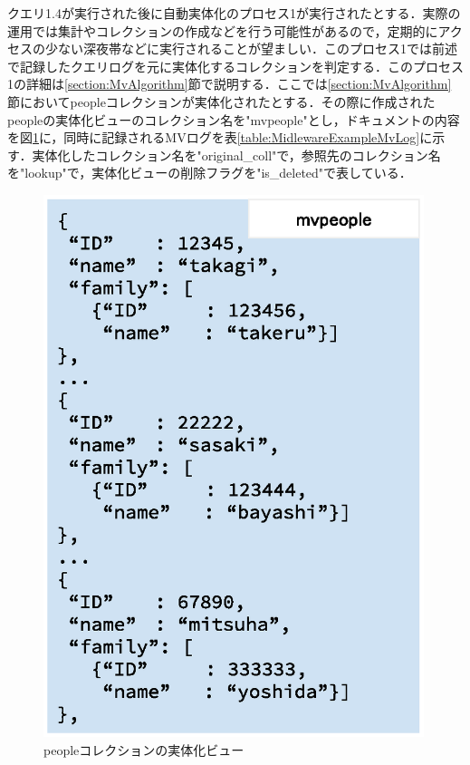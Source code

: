 \documentclass[a4paper,11pt]{ujreport}
\begin{document}
クエリ1.4が実行された後に自動実体化のプロセス1が実行されたとする．実際の運用では集計やコレクションの作成などを行う可能性があるので，定期的にアクセスの少ない深夜帯などに実行されることが望ましい．このプロセス1では前述で記録したクエリログを元に実体化するコレクションを判定する．このプロセス1の詳細は\ref{section:MvAlgorithm}節で説明する．ここでは\ref{section:MvAlgorithm}節においてpeopleコレクションが実体化されたとする．その際に作成されたpeopleの実体化ビューのコレクション名を"mvpeople"とし，ドキュメントの内容を図\ref{figure:MidlewareExampleMV}に，同時に記録されるMVログを表\ref{table:MidlewareExampleMvLog}に示す．実体化したコレクション名を"original\_coll"で，参照先のコレクション名を"lookup"で，実体化ビューの削除フラグを"is\_deleted"で表している．

\begin{figure}[htbp]
	\begin{center}
		\includegraphics[width=30em, trim=0 0 0 0]{src/MidlewareExampleMV.eps} %
	\end{center}
	\caption{peopleコレクションの実体化ビュー}
	\label{figure:MidlewareExampleMV}
\end{figure}
\end{document}
